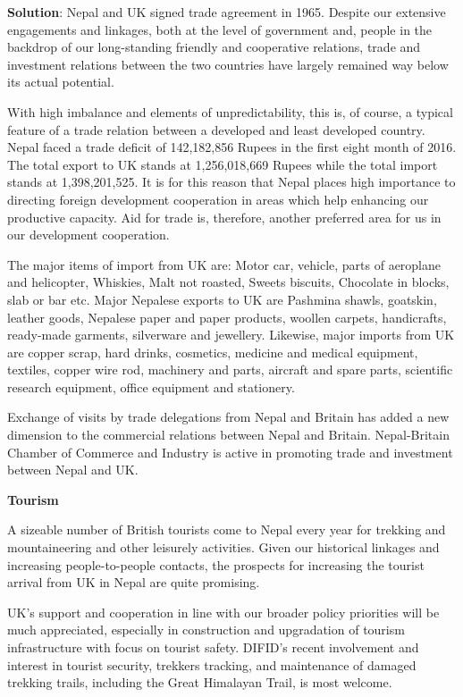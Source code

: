 \documentclass[
  openany]{book}
\newenvironment{solution}{ {\bfseries Solution}:}{}
\begin{document}
\begin{solution}
Nepal and UK signed trade agreement in 1965. Despite our extensive engagements and linkages, both at the level of government and, people in the backdrop of our long-standing friendly and cooperative relations, trade and investment relations between the two countries have largely remained way below its actual potential.

With high imbalance and elements of unpredictability, this is, of course, a typical feature of a trade relation between a developed and least developed country. Nepal faced a trade deficit of 142,182,856 Rupees in the first eight month of 2016. The total export to UK stands at 1,256,018,669 Rupees while the total import stands at 1,398,201,525. It is for this reason that Nepal places high importance to directing foreign development cooperation in areas which help enhancing our productive capacity. Aid for trade is, therefore, another preferred area for us in our development cooperation. 

The major items of import from UK are: Motor car, vehicle, parts of aeroplane and helicopter, Whiskies, Malt not roasted, Sweets biscuits, Chocolate in blocks, slab or bar etc. Major Nepalese exports to UK are Pashmina shawls, goatskin, leather goods, Nepalese paper and paper products, woollen carpets, handicrafts, ready-made garments, silverware and jewellery. Likewise, major imports from UK are copper scrap, hard drinks, cosmetics, medicine and medical equipment, textiles, copper wire rod, machinery and parts, aircraft and spare parts, scientific research equipment, office equipment and stationery.

Exchange of visits by trade delegations from Nepal and Britain has added a new dimension to the commercial relations between Nepal and Britain. Nepal-Britain Chamber of Commerce and Industry is active in promoting trade and investment between Nepal and UK.

\textbf{Tourism}

A sizeable number of British tourists come to Nepal every year for trekking and mountaineering and other leisurely activities. Given our historical linkages and increasing people-to-people contacts, the prospects for increasing the tourist arrival from UK in Nepal are quite promising.

UK's support and cooperation in line with our broader policy priorities will be much appreciated, especially in construction and upgradation of tourism infrastructure with focus on tourist safety. DIFID’s recent involvement and interest in tourist security, trekkers tracking, and maintenance of damaged trekking trails, including the Great Himalayan Trail, is most welcome.


\end{solution}
\end{document}
